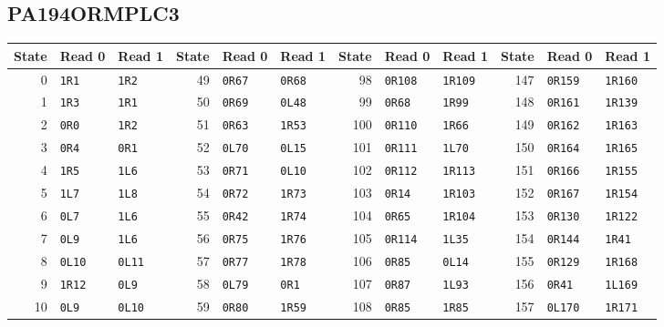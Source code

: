 \subsection{PA194ORMPLC3}
\begin{center}
\begingroup\fontsize{8.5}{10}\selectfont\setlength{\tabcolsep}{3.3pt}\renewcommand{\arraystretch}{1.03}
\begin{tabular}{rll@{\qquad}rll@{\qquad}rll@{\qquad}rll}
\toprule
State & Read 0 & Read 1 & State & Read 0 & Read 1 & State & Read 0 & Read 1 & State & Read 0 & Read 1\\
\midrule
0 & \texttt{1R1} & \texttt{1R2} & 49 & \texttt{0R67} & \texttt{0R68} & 98 & \texttt{0R108} & \texttt{1R109} & 147 & \texttt{0R159} & \texttt{1R160}\\
1 & \texttt{1R3} & \texttt{1R1} & 50 & \texttt{0R69} & \texttt{0L48} & 99 & \texttt{0R68} & \texttt{1R99} & 148 & \texttt{0R161} & \texttt{1R139}\\
2 & \texttt{0R0} & \texttt{1R2} & 51 & \texttt{0R63} & \texttt{1R53} & 100 & \texttt{0R110} & \texttt{1R66} & 149 & \texttt{0R162} & \texttt{1R163}\\
3 & \texttt{0R4} & \texttt{0R1} & 52 & \texttt{0L70} & \texttt{0L15} & 101 & \texttt{0R111} & \texttt{1L70} & 150 & \texttt{0R164} & \texttt{1R165}\\
4 & \texttt{1R5} & \texttt{1L6} & 53 & \texttt{0R71} & \texttt{0L10} & 102 & \texttt{0R112} & \texttt{1R113} & 151 & \texttt{0R166} & \texttt{1R155}\\
5 & \texttt{1L7} & \texttt{1L8} & 54 & \texttt{0R72} & \texttt{1R73} & 103 & \texttt{0R14} & \texttt{1R103} & 152 & \texttt{0R167} & \texttt{1R154}\\
6 & \texttt{0L7} & \texttt{1L6} & 55 & \texttt{0R42} & \texttt{1R74} & 104 & \texttt{0R65} & \texttt{1R104} & 153 & \texttt{0R130} & \texttt{1R122}\\
7 & \texttt{0L9} & \texttt{1L6} & 56 & \texttt{0R75} & \texttt{1R76} & 105 & \texttt{0R114} & \texttt{1L35} & 154 & \texttt{0R144} & \texttt{1R41}\\
8 & \texttt{0L10} & \texttt{0L11} & 57 & \texttt{0R77} & \texttt{1R78} & 106 & \texttt{0R85} & \texttt{0L14} & 155 & \texttt{0R129} & \texttt{1R168}\\
9 & \texttt{1R12} & \texttt{0L9} & 58 & \texttt{0L79} & \texttt{0R1} & 107 & \texttt{0R87} & \texttt{1L93} & 156 & \texttt{0R41} & \texttt{1L169}\\
10 & \texttt{0L9} & \texttt{0L10} & 59 & \texttt{0R80} & \texttt{1R59} & 108 & \texttt{0R85} & \texttt{1R85} & 157 & \texttt{0L170} & \texttt{1R171}\\

\end{tabular}
\end{center}
